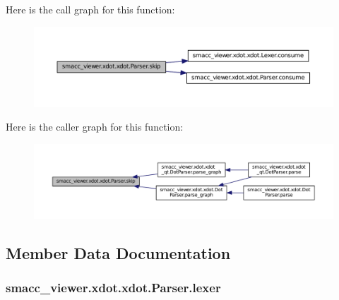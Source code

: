 Here is the call graph for this function\+:
\nopagebreak
\begin{figure}[H]
\begin{center}
\leavevmode
\includegraphics[width=350pt]{classsmacc__viewer_1_1xdot_1_1xdot_1_1Parser_ab6641c5df2047b92e65244eba82cb75d_cgraph}
\end{center}
\end{figure}




Here is the caller graph for this function\+:
\nopagebreak
\begin{figure}[H]
\begin{center}
\leavevmode
\includegraphics[width=350pt]{classsmacc__viewer_1_1xdot_1_1xdot_1_1Parser_ab6641c5df2047b92e65244eba82cb75d_icgraph}
\end{center}
\end{figure}




\subsection{Member Data Documentation}
\subsubsection[{\texorpdfstring{lexer}{lexer}}]{\setlength{\rightskip}{0pt plus 5cm}smacc\+\_\+viewer.\+xdot.\+xdot.\+Parser.\+lexer}\hypertarget{classsmacc__viewer_1_1xdot_1_1xdot_1_1Parser_a62d14956c8f00404c642ce01c290c3d1}{}\label{classsmacc__viewer_1_1xdot_1_1xdot_1_1Parser_a62d14956c8f00404c642ce01c290c3d1}


